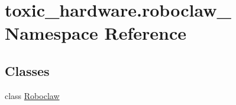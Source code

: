 \hypertarget{namespacetoxic__hardware_1_1roboclaw__3}{}\section{toxic\+\_\+hardware.\+roboclaw\+\_ Namespace Reference}
\label{namespacetoxic__hardware_1_1roboclaw__3}
\subsection*{Classes}
\begin{DoxyCompactItemize}
\item 
class \mbox{\hyperlink{classtoxic__hardware_1_1roboclaw__3_1_1Roboclaw}{Roboclaw}}
\end{DoxyCompactItemize}
